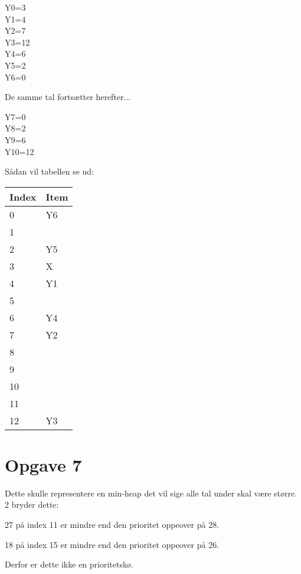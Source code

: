 \documentclass{article}
\begin{document}
Y0=3\\
Y1=4\\
Y2=7\\
Y3=12\\
Y4=6\\
Y5=2\\
Y6=0

De samme tal fortsætter herefter...

Y7=0\\
Y8=2\\
Y9=6\\
Y10=12

Sådan vil tabellen se ud:
\begin{table}[H]
\centering
\begin{tabular}{|l|l|}
\hline
\rowcolor[HTML]{C0C0C0} 
Index    & Item \\ \hline
0        & Y6    \\ \hline
1        &      \\ \hline
2        & Y5    \\ \hline
3        & X    \\ \hline
4        & Y1   \\ \hline
5        &      \\ \hline
6        & Y4     \\ \hline
7        & Y2     \\ \hline
8        &     \\ \hline
9        &    \\ \hline
10       &     \\ \hline
11       &      \\ \hline
12       & Y3     \\ \hline
\end{tabular}
\end{table}


\section{Opgave 7}
Dette skulle representere en min-heap det vil sige alle tal under skal være større. 2 bryder dette:

27 på index 11 er mindre end den prioritet oppeover på 28.

18 på index 15 er mindre end den prioritet oppeover på 26.

Derfor er dette ikke en prioritetskø.
\end{document}
